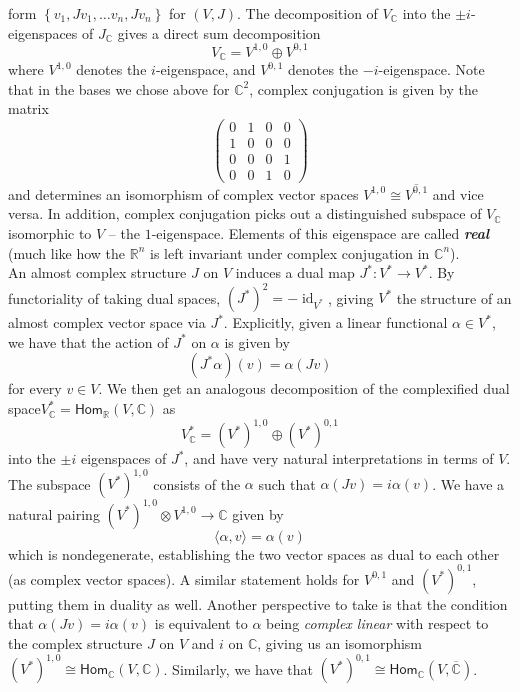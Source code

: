 \documentclass[psamsfonts, 12pt]{amsart}
\theoremstyle{definition}
\theoremstyle{remark}
\renewcommand{\hom}{\mathsf{Hom}}
\newcommand{\R}{\mathbb{R}}
\newcommand{\ib}[1]{\textbf{\textit{#1}}}
\newcommand{\C}{\mathbb{C}}
\newcommand{\set}[1]{\left\lbrace #1 \right\rbrace}
\DeclareMathOperator{\id}{id}
\begin{document}
form $\set{v_1, Jv_1, \ldots v_n, Jv_n}$ for $(V,J)$. The decomposition of $V_\C$ into
the $\pm i$-eigenspaces of $J_\C$ gives a direct sum decomposition
\[
V_\C = V^{1,0} \oplus V^{0,1}
\]
where $V^{1,0}$ denotes the $i$-eigenspace, and $V^{0,1}$ denotes the $-i$-eigenspace.
Note that in the bases we chose above for $\C^2$, complex conjugation is given by the
matrix
\[
\begin{pmatrix}
0 & 1 & 0 & 0\\
1 & 0 & 0 & 0 \\
0 & 0 & 0 & 1 \\
0 & 0 & 1 & 0
\end{pmatrix}
\]
and determines an isomorphism of complex vector spaces
$V^{1,0} \cong \overline{V^{0,1}}$ and vice versa. In addition, complex conjugation
picks out a distinguished subspace of $V_\C$ isomorphic to $V$ -- the $1$-eigenspace.
Elements of this eigenspace are called \ib{real} (much like how the $\R^n$
is left invariant under complex conjugation in $\C^n$). \\

An almost complex structure $J$ on $V$ induces a dual map $J^* : V^* \to V^*$. By
functoriality of taking dual spaces, $(J^*) ^2 = -\id_{V^*}$, giving $V^*$ the
structure of an almost complex vector space via $J^*$. Explicitly, given a linear
functional $\alpha \in V^*$, we have that the action of $J^*$ on $\alpha$ is given
by
\[
(J^*\alpha)(v) = \alpha(Jv)
\]
for every $v \in V$. We then get an analogous decomposition of the complexified
dual space$ V^*_\C = \hom_\R(V,\C)$ as
\[
V^*_\C = (V^*)^{1,0} \oplus (V^*)^{0,1}
\]
into the $\pm i$ eigenspaces of $J^*$, and have very natural interpretations in
terms of $V$. The subspace $(V^*)^{1,0}$ consists of the $\alpha$ such that
$\alpha(Jv) = i\alpha(v)$. We have a natural pairing $(V^*)^{1,0} \otimes V^{1,0} \to \C$
given by
\[
\langle \alpha,v \rangle = \alpha(v)
\]
which is nondegenerate, establishing the two vector spaces as dual to each other (as
complex vector spaces). A similar statement holds for $V^{0,1}$ and $(V^*)^{0,1}$,
putting them in duality as well. Another perspective to take is that the condition
that $\alpha(Jv) = i\alpha(v)$ is equivalent to $\alpha$ being \emph{complex linear}
with respect to the complex structure $J$ on $V$ and $i$ on $\C$, giving us an
isomorphism $(V^*)^{1,0} \cong \hom_\C(V,\C)$. Similarly, we have that
$(V^*)^{0,1} \cong \hom_{\C}(V,\overline{\C})$.\\
\end{document}
